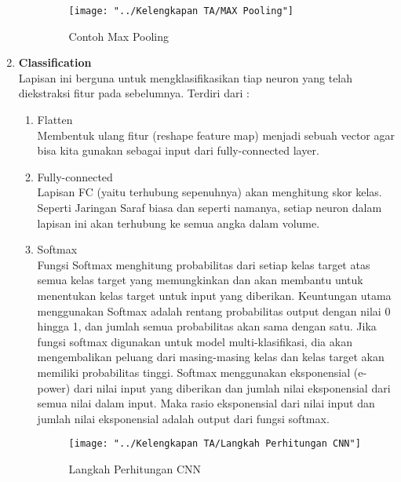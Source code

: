 \documentclass[a4paper]{article}
\begin{document}
\begin{enumerate}
\begin{enumerate}
					\begin{figure}[h]
						\centering
						\texttt{[image: "../Kelengkapan TA/MAX Pooling"]}
						\caption[Max Pooling]{Contoh Max Pooling}
						\label{fig:max-pooling}
					\end{figure}
				\newpage
				\end{enumerate}
				\item \textbf{Classification} \\
				Lapisan ini berguna untuk mengklasifikasikan tiap neuron yang telah diekstraksi fitur pada sebelumnya. Terdiri dari :
				
				\begin{enumerate}
					\item Flatten\\
					Membentuk ulang fitur (reshape feature map) menjadi sebuah vector agar bisa kita gunakan sebagai input dari fully-connected layer.
					\item Fully-connected\\
					Lapisan FC (yaitu terhubung sepenuhnya) akan menghitung skor kelas. Seperti Jaringan Saraf biasa dan seperti namanya, setiap neuron dalam lapisan ini akan terhubung ke semua angka dalam volume.
					\item Softmax\\
					Fungsi Softmax menghitung probabilitas dari setiap kelas target atas semua kelas target yang memungkinkan dan akan membantu untuk menentukan kelas target untuk input yang diberikan. Keuntungan utama menggunakan Softmax adalah rentang probabilitas output dengan nilai 0 hingga 1, dan jumlah semua probabilitas akan sama dengan satu. Jika fungsi softmax digunakan untuk model multi-klasifikasi, dia akan mengembalikan peluang dari masing-masing kelas dan kelas target akan memiliki probabilitas tinggi. Softmax menggunakan eksponensial (e-power) dari nilai input yang diberikan dan jumlah nilai eksponensial dari semua nilai dalam input. Maka rasio eksponensial dari nilai input dan jumlah nilai eksponensial adalah output dari fungsi softmax.
					\begin{figure}[h]
						\centering
						\texttt{[image: "../Kelengkapan TA/Langkah Perhitungan CNN"]}
						\caption[Calculation by Weight]{Langkah Perhitungan CNN}
						\label{fig:langkah-perhitungan-cnn}
					\end{figure}
				
				\end{enumerate}
				
			\end{enumerate}
	
\end{document}
